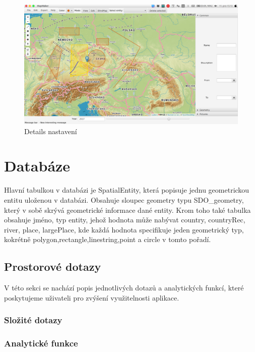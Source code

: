 \documentclass[12pt,a4paper,titlepage]{article}
\begin{document}
\begin{figure}[!htbp]
	\centering
	\includegraphics[scale=0.25]{full_window}
	\caption{Details nastavení}
	\label{settings}
\end{figure}

\section{Databáze}
Hlavní tabulkou v databázi je SpatialEntity, která popisuje jednu geometrickou entitu uloženou v databázi. Obsahuje sloupec geometry typu SDO_geometry, který v sobě skrývá geometrické informace dané entity. Krom toho také tabulka obsahuje jméno, typ entity, jehož hodnota může nabývat country, countryRec, river, place, largePlace, kde každá hodnota specifikuje jeden geometrický typ, kokrétně polygon,rectangle,linestring,point a circle v tomto pořadí.

\subsection{Prostorové dotazy}
V této sekci se nachází popis jednotlivých dotazů a analytických funkcí, které poskytujeme uživateli pro zvýšení využitelnosti aplikace.

\subsubsection{Složité dotazy}



\subsubsection{Analytické funkce}
\end{document}

